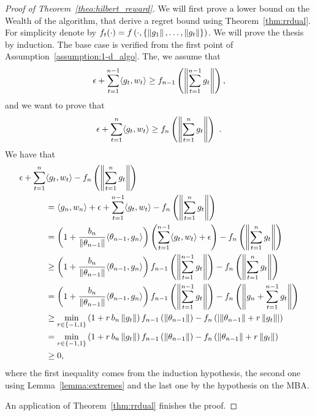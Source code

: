\begin{proof}[Proof of Theorem~\ref{theo:hilbert_reward}]
  We will first prove a lower bound on the Wealth of the algorithm, that derive a regret bound using Theorem~\ref{thm:rrdual}.
  For simplicity denote by $f_t(\cdot)=f\left(\cdot, \{\left\|{g_1}\right\|, \ldots, \left\|{g_t}\right\|\}\right)$.
  We will prove the thesis by induction. The base case is verified from the first point of Assumption~\ref{assumption:1-d_algo}. The, we assume that 
  \[
  \epsilon + \sum_{t=1}^{n-1} \langle g_t, w_t \rangle \geq f_{n-1}\left( \left\|{\sum_{t=1}^{n-1} g_t}\right\|\right),
  \]
  and we want to prove that 
  \[
  \epsilon + \sum_{t=1}^{n} \langle g_t, w_t \rangle \geq f_{n}\left( \left\|{\sum_{t=1}^{n} g_t}\right\|\right)~.
  \]
  We have that
  \begin{align*}
  \epsilon + \sum_{t=1}^{n} &\langle g_t, w_t \rangle - f_n\left( \left\|{\sum_{t=1}^{n} g_t}\right\|\right) \\
  &= \langle g_n, w_n \rangle + \epsilon + \sum_{t=1}^{n-1} \langle g_t, w_t \rangle - f_n\left( \left\|{\sum_{t=1}^{n} g_t}\right\|\right)\\
  &= \left(1+\frac{b_n}{\left\|{\theta_{n-1}}\right\|}\langle \theta_{n-1},g_n \rangle \right)\left(\sum_{t=1}^{n-1} \langle g_t, w_t \rangle +\epsilon \right) - f_n\left( \left\|{\sum_{t=1}^{n} g_t}\right\|\right)\\
  &\geq \left(1+\frac{b_n}{\left\|{\theta_{n-1}}\right\|}\langle \theta_{n-1},g_n \rangle \right) f_{n-1}\left( \left\|{\sum_{t=1}^{n-1} g_t}\right\|\right) - f_n\left( \left\|{\sum_{t=1}^{n} g_t}\right\|\right)\\
  &= \left(1+\frac{b_n}{\left\|{\theta_{n-1}}\right\|}\langle \theta_{n-1},g_n \rangle \right) f_{n-1}\left( \left\|{\sum_{t=1}^{n-1} g_t}\right\|\right) - f_n\left( \left\|{g_n + \sum_{t=1}^{n-1} g_t}\right\|\right)\\
  &\geq \min_{r\in \{-1,1\}} \left(1+ r\, b_n \left\|{g_t}\right\|\right) f_{n-1}\left( \left\|{\theta_{n-1}}\right\|\right) - f_n\left(\left| \left\|{\theta_{n-1}}\right\| + r\left\|{g_t}\right\|\right|\right)\\
  &= \min_{r\in \{-1,1\}} \left(1+ r\, b_n \left\|{g_t}\right\|\right) f_{n-1}\left( \left\|{\theta_{n-1}}\right\|\right) - f_n\left( \left\|{\theta_{n-1}}\right\| + r \left\|{g_t}\right\|\right)\\
  &\geq 0,
  \end{align*}
  where the first inequality comes from the induction hypothesis, the second one using Lemma~\ref{lemma:extremes} and the last one by the hypothesis on the \ac{MBA}.
  
  An application of Theorem~\ref{thm:rrdual} finishes the proof.
\end{proof}

